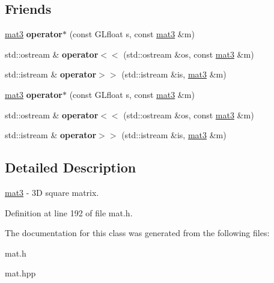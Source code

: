 \subsection*{\-Friends}
\begin{DoxyCompactItemize}
\item 
\hypertarget{class_angel_1_1mat3_ad9345c93609b63264fb4a4d48cef9e47}{\hyperlink{class_angel_1_1mat3}{mat3} {\bfseries operator$\ast$} (const \-G\-Lfloat s, const \hyperlink{class_angel_1_1mat3}{mat3} \&m)}\label{class_angel_1_1mat3_ad9345c93609b63264fb4a4d48cef9e47}

\item 
\hypertarget{class_angel_1_1mat3_a85d71885cc6797f2553701eb01c52851}{std\-::ostream \& {\bfseries operator$<$$<$} (std\-::ostream \&os, const \hyperlink{class_angel_1_1mat3}{mat3} \&m)}\label{class_angel_1_1mat3_a85d71885cc6797f2553701eb01c52851}

\item 
\hypertarget{class_angel_1_1mat3_aa6ac075e9f3776b3d6eba3e8207ab990}{std\-::istream \& {\bfseries operator$>$$>$} (std\-::istream \&is, \hyperlink{class_angel_1_1mat3}{mat3} \&m)}\label{class_angel_1_1mat3_aa6ac075e9f3776b3d6eba3e8207ab990}

\item 
\hypertarget{class_angel_1_1mat3_ad9345c93609b63264fb4a4d48cef9e47}{\hyperlink{class_angel_1_1mat3}{mat3} {\bfseries operator$\ast$} (const \-G\-Lfloat s, const \hyperlink{class_angel_1_1mat3}{mat3} \&m)}\label{class_angel_1_1mat3_ad9345c93609b63264fb4a4d48cef9e47}

\item 
\hypertarget{class_angel_1_1mat3_a85d71885cc6797f2553701eb01c52851}{std\-::ostream \& {\bfseries operator$<$$<$} (std\-::ostream \&os, const \hyperlink{class_angel_1_1mat3}{mat3} \&m)}\label{class_angel_1_1mat3_a85d71885cc6797f2553701eb01c52851}

\item 
\hypertarget{class_angel_1_1mat3_aa6ac075e9f3776b3d6eba3e8207ab990}{std\-::istream \& {\bfseries operator$>$$>$} (std\-::istream \&is, \hyperlink{class_angel_1_1mat3}{mat3} \&m)}\label{class_angel_1_1mat3_aa6ac075e9f3776b3d6eba3e8207ab990}

\end{DoxyCompactItemize}


\subsection{\-Detailed \-Description}
\hyperlink{class_angel_1_1mat3}{mat3} -\/ 3\-D square matrix. 

\-Definition at line 192 of file mat.\-h.



\-The documentation for this class was generated from the following files\-:\begin{DoxyCompactItemize}
\item 
mat.\-h\item 
mat.\-hpp\end{DoxyCompactItemize}
